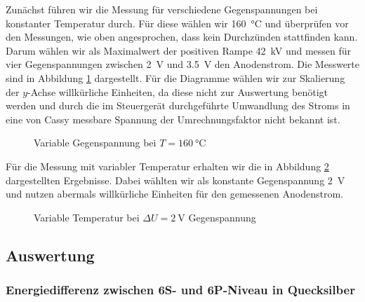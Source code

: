 \documentclass[11pt, a4paper]{article}
\begin{document}
Zunächst führen wir die Messung für verschiedene Gegenspannungen bei konstanter Temperatur durch.
Für diese wählen wir \SI{160}{\degreeCelsius} und überprüfen vor den Messungen, wie oben angesprochen, dass kein Durchzünden stattfinden kann.
Darum wählen wir als Maximalwert der positiven Rampe \SI{42}{\kilo\volt} und messen für vier Gegenspannungen zwischen \SI{2}{\volt} und \SI{3.5}{\volt} den Anodenstrom.
Die Messwerte sind in Abbildung \ref{fig:fh_varvolt} dargestellt.
Für die Diagramme wählen wir zur Skalierung der $y$-Achse willkürliche Einheiten, da diese nicht zur Auswertung benötigt werden und durch die im Steuergerät durchgeführte Umwandlung des Stroms in eine von Cassy messbare Spannung der Umrechnungsfaktor nicht bekannt ist.
\begin{figure}[!h]
\centering

\caption{Variable Gegenspannung bei $T=\SI{160}{\degreeCelsius}$}
\label{fig:fh_varvolt}
\end{figure}
Für die Messung mit variabler Temperatur erhalten wir die in Abbildung \ref{fig:fh_vartemp} dargestellten Ergebnisse.
Dabei wählten wir als konstante Gegenspannung \SI{2}{\volt} und nutzen abermals willkürliche Einheiten für den gemessenen Anodenstrom.
\begin{figure}[!h]
\centering

\caption{Variable Temperatur bei $\Delta U=\SI{2}{\volt}$ Gegenspannung}
\label{fig:fh_vartemp}
\end{figure}

\subsection{Auswertung}

\subsubsection{Energiedifferenz zwischen 6S- und 6P-Niveau in Quecksilber}
\end{document}
